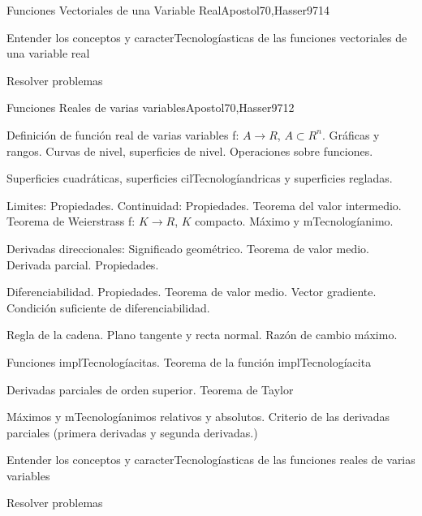 \begin{syllabus}
\begin{unit}{Funciones Vectoriales de una Variable Real}{Apostol70,Hasser97}{14}
   \begin{unitgoals}
         \item  Entender los conceptos y caracterTecnologíasticas de las funciones vectoriales de una variable real
         \item  Resolver problemas
   \end{unitgoals}
\end{unit}

\begin{unit}{Funciones Reales de varias variables}{Apostol70,Hasser97}{12}
   \begin{topics}
	\item  Definición de función real de varias variables f: $A \rightarrow R$, $A \subset R^n$. Gráficas y rangos. Curvas de nivel, superficies de nivel. Operaciones sobre funciones.
	\item  Superficies cuadráticas, superficies cilTecnologíandricas y superficies regladas.
	\item  Limites: Propiedades. Continuidad: Propiedades. Teorema del valor intermedio. Teorema de Weierstrass f: $K \rightarrow R$, $K$ compacto. Máximo y mTecnologíanimo.
	\item  Derivadas direccionales: Significado geométrico. Teorema de valor medio. Derivada parcial. Propiedades.
	\item  Diferenciabilidad. Propiedades. Teorema de valor medio. Vector gradiente. Condición suficiente de diferenciabilidad.
	\item  Regla de la cadena. Plano tangente y recta normal. Razón de cambio máximo.
	\item Funciones implTecnologíacitas. Teorema de la función implTecnologíacita
	\item Derivadas parciales de orden superior. Teorema de Taylor
	\item Máximos y mTecnologíanimos relativos y absolutos. Criterio de las derivadas parciales (primera derivadas y segunda derivadas.)
   \end{topics}

   \begin{unitgoals}
         \item  Entender los conceptos y caracterTecnologíasticas de las funciones reales de varias variables
         \item  Resolver problemas
   \end{unitgoals}
\end{unit}


\end{syllabus}
